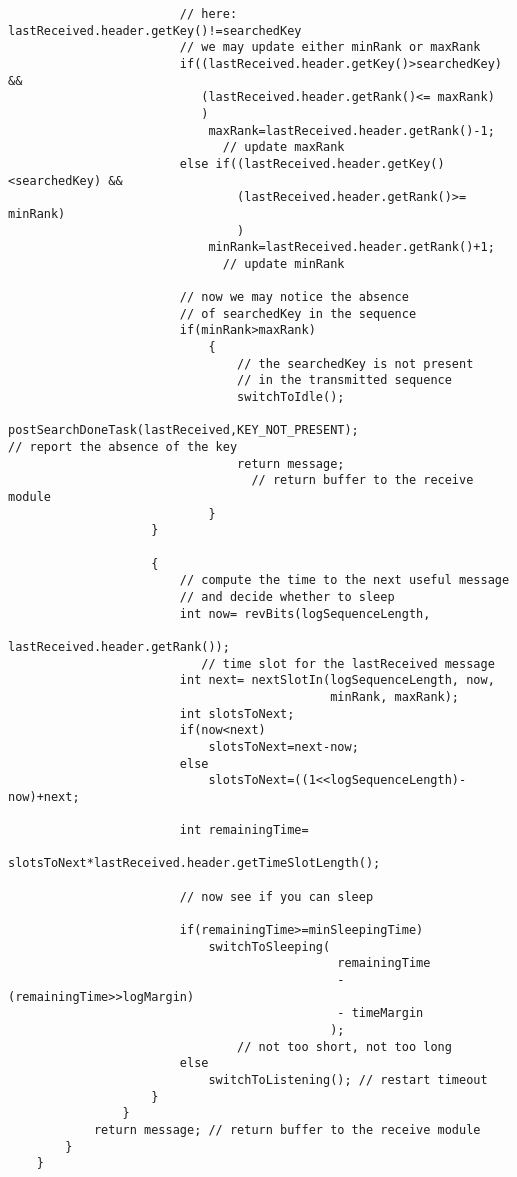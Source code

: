 \documentclass{letter}
\begin{document}
\begin{verbatim}
                        // here: lastReceived.header.getKey()!=searchedKey
                        // we may update either minRank or maxRank
                        if((lastReceived.header.getKey()>searchedKey) && 
                           (lastReceived.header.getRank()<= maxRank) 
                           )
                            maxRank=lastReceived.header.getRank()-1; 
                              // update maxRank
                        else if((lastReceived.header.getKey()<searchedKey) &&
                                (lastReceived.header.getRank()>= minRank) 
                                )
                            minRank=lastReceived.header.getRank()+1; 
                              // update minRank
                                
                        // now we may notice the absence 
                        // of searchedKey in the sequence
                        if(minRank>maxRank)
                            {
                                // the searchedKey is not present 
                                // in the transmitted sequence
                                switchToIdle();
                                postSearchDoneTask(lastReceived,KEY_NOT_PRESENT);                                 // report the absence of the key
                                return message; 
                                  // return buffer to the receive module
                            }
                    }

                    {
                        // compute the time to the next useful message 
                        // and decide whether to sleep
                        int now= revBits(logSequenceLength,
                                         lastReceived.header.getRank());
                           // time slot for the lastReceived message
                        int next= nextSlotIn(logSequenceLength, now, 
                                             minRank, maxRank);
                        int slotsToNext;
                        if(now<next)
                            slotsToNext=next-now;
                        else
                            slotsToNext=((1<<logSequenceLength)-now)+next;

                        int remainingTime=
                           slotsToNext*lastReceived.header.getTimeSlotLength();

                        // now see if you can sleep
                        
                        if(remainingTime>=minSleepingTime)
                            switchToSleeping(
                                              remainingTime 
                                              - (remainingTime>>logMargin)
                                              - timeMargin 
                                             );
                                // not too short, not too long
                        else
                            switchToListening(); // restart timeout
                    }
                }
            return message; // return buffer to the receive module
        }
    } 
\end{verbatim}
\end{document}
